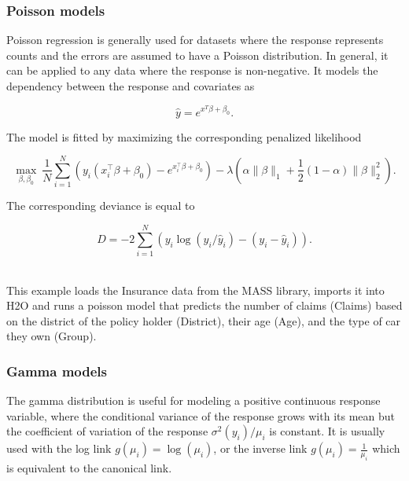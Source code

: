 

\waterExampleInPython


\subsubsection{Poisson models}
Poisson regression is generally used for datasets where the response represents counts and the errors are assumed to have a
Poisson distribution. In general, it can be applied to any data where the response is non-negative. It models the dependency between the
response and covariates as

$$\hat{y} = e^{x^T\beta + \beta_0} .$$

The model is fitted by maximizing the corresponding penalized likelihood

$$  \max_{\beta,\beta_0}  \ \frac{1}{N} \sum_{i=1}^{N}  \left(   y_i (x_i^{\top}\beta  + \beta_0) - e^{x_i^{\top}\beta  + \beta_0} \right) 
- \lambda \left(\alpha \|\beta \|_1 + \frac{1}{2}(1-\alpha) \| \beta \|_2^2 \right). $$

The corresponding deviance is equal to 

$$D = -2\sum_{i=1}^{N} \left( y_i \log(y_i/\hat{y}_i) - ( y_i - \hat{y}_i  ) \right) .$$

\waterExampleInR
\\
This example loads the Insurance data from the MASS library, imports it into H2O and runs a poisson model that predicts the number of claims (Claims) based on the district of the policy holder (District), their age (Age), and the type of car they
own (Group).
\bigskip


\waterExampleInPython


\subsubsection{Gamma models}
The gamma distribution is useful for modeling a positive continuous response variable, where the conditional
variance of the response grows with its mean but the coefficient of variation of the response $\sigma^2(y_i)/\mu_i$ is
constant. It is usually used with the log link $g(\mu_i)= \log(\mu_i)$, or the inverse link $g(\mu_i) = \frac{1}{\mu_i} $ which is equivalent to the canonical link.

